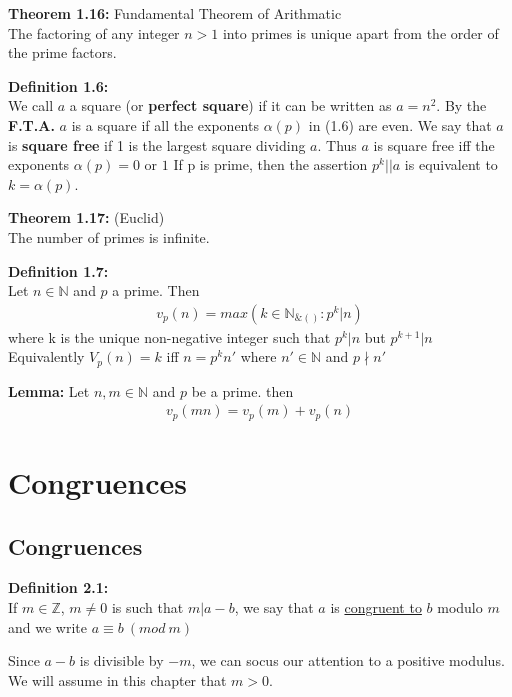 \documentclass[a4paper]{article}
\begin{document}
\textbf{Theorem 1.16:} Fundamental Theorem of Arithmatic\\
The factoring of any integer $n>1$ into primes is unique apart from
the order of the prime factors.

\textbf{Definition 1.6:}\\
We call $a$ a square (or \textbf{perfect square}) if it can be written as $a=n^2$.
By the \textbf{F.T.A.} $a$ is a square if all the exponents $\alpha(p)$ in (1.6)
are even. We say that $a$ is \textbf{square free} if 1 is the largest square
dividing $a$. Thus $a$ is square free iff the exponents $\alpha(p)=0$ or $1$
If p is prime, then the assertion $p^k||a$ is equivalent to $k=\alpha(p)$.

\textbf{Theorem 1.17:} (Euclid)\\
The number of primes is infinite.

\textbf{Definition 1.7:}\\
Let $n\in\mathbb{N}$ and $p$ a prime. Then
\begin{align}
    v_p(n) = max(k\in\mathbb{N}_{\&()}:p^k|n)
\end{align}
where k is the unique non-negative integer such that $p^k|n$ but $p^{k+1}|n$\\
Equivalently $V_p(n)=k$ iff $n=p^kn'$ where $n'\in\mathbb{N}$ and $p\nmid n'$

\textbf{Lemma:}
Let $n,m\in\mathbb{N}$ and $p$ be a prime. then
\begin{align}
    v_p(mn)=v_p(m)+v_p(n)
\end{align}


\section{Congruences}

\subsection{Congruences}

\textbf{Definition 2.1:}\\
If $m\in\mathbb{Z}$, $m\neq0$ is such that $m|a-b$, we say that $a$ is
\underline{congruent to} $b$ modulo $m$ and we write $a\equiv b\ (mod\ m)$

Since $a-b$ is divisible by $-m$, we can socus our attention to a positive modulus.
We will assume in this chapter that $m>0$.
\end{document}
